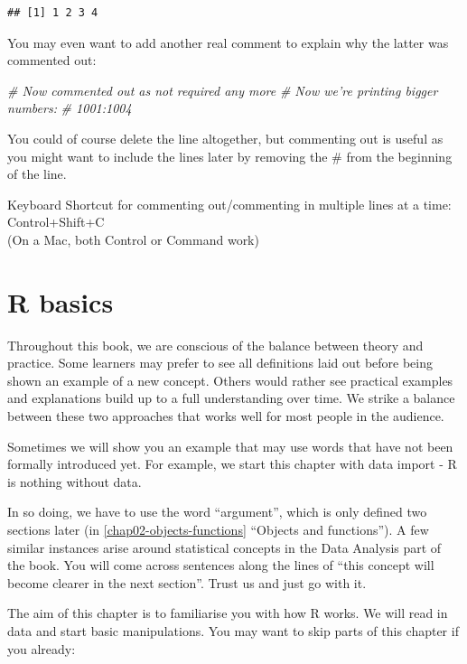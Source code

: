 \documentclass[
  12pt,
  krantz2]{krantz}
\makeatletter
\newenvironment{Shaded}{\begin{snugshade}}{\end{snugshade}}
\newcommand{\CommentTok}[1]{\textcolor[rgb]{0.56,0.35,0.01}{\textit{#1}}}
\renewenvironment{quote}{\begin{VF}}{\end{VF}}
\newenvironment{kframe}{%
\medskip{}
\setlength{\fboxsep}{.8em}
 \def\at@end@of@kframe{}%
 \ifinner\ifhmode%
  \def\at@end@of@kframe{\end{minipage}}%
  \begin{minipage}{\columnwidth}%
 \fi\fi%
 \def\FrameCommand##1{\hskip\@totalleftmargin \hskip-\fboxsep
 \colorbox{shadecolor}{##1}\hskip-\fboxsep
     \hskip-\linewidth \hskip-\@totalleftmargin \hskip\columnwidth}%
 \MakeFramed {\advance\hsize-\width
   \@totalleftmargin\z@ \linewidth\hsize
   \@setminipage}}%
 {\par\unskip\endMakeFramed%
 \at@end@of@kframe}
\renewenvironment{Shaded}{\begin{kframe}}{\end{kframe}}
\makeatother
\begin{document}
\begin{verbatim}
## [1] 1 2 3 4
\end{verbatim}

You may even want to add another real comment to explain why the latter was commented out:

\begin{Shaded}
\begin{Highlighting}[]
\CommentTok{# Now commented out as not required any more}
\CommentTok{# Now we're printing bigger numbers:}
\CommentTok{# 1001:1004}
\end{Highlighting}
\end{Shaded}

You could of course delete the line altogether, but commenting out is useful as you might want to include the lines later by removing the \# from the beginning of the line.

\begin{quote}
Keyboard Shortcut for commenting out/commenting in multiple lines at a time:
Control+Shift+C\\
(On a Mac, both Control or Command work)
\end{quote}

\hypertarget{r-basics}{%
\chapter{R basics}\label{r-basics}}

Throughout this book, we are conscious of the balance between theory and practice.
Some learners may prefer to see all definitions laid out before being shown an example of a new concept.
Others would rather see practical examples and explanations build up to a full understanding over time.
We strike a balance between these two approaches that works well for most people in the audience.

Sometimes we will show you an example that may use words that have not been formally introduced yet.
For example, we start this chapter with data import - R is nothing without data.

In so doing, we have to use the word ``argument'', which is only defined two sections later (in \ref{chap02-objects-functions} ``Objects and functions'').
A few similar instances arise around statistical concepts in the Data Analysis part of the book.
You will come across sentences along the lines of ``this concept will become clearer in the next section''.
Trust us and just go with it.

The aim of this chapter is to familiarise you with how R works.
We will read in data and start basic manipulations. You may want to skip parts of this chapter if you already:
\end{document}
